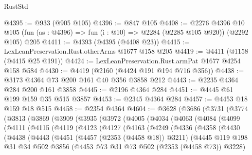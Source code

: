\begin{lexlean}{RustStd}
\begin{coremodule}
@4395 := @933 (@905 @105)
@4396 := @847 @105
@4408 := @2276
    @4396
    @10
    @105
    (fun (as : @4396) => fun (i : @10) => @2284 (@2285 @105 @920))
    (@2292 @105)
    @205
@4411 := @4393 (@4395 (@4408 @23))
@4415 := LexLeanPreservation.Rust.otherArms @1677 @158 @205
@4419 := @4411 (@1158 (@4415 @25 @191))
@4424 := LexLeanPreservation.Rust.armPat @1677 @4254 @158 @584
@4430 := @4419 (@2160 (@4424 @191 @194 @716 @356))
@4438 := @3173 @4364 @73 @200 @161 @40 @356 @3858 @212
@4443 := @2235 @4364 @284 @200 @161 @3858
@4445 := @2196 @4364 @284
@4451 := @4445 @61 @199 @159 @35 @515 @3857
@4453 := @2345 @4364 @284
@4457 := @4453 @18 @159 @18 @515
@4458 := @2354 @4364
@4604 := @3628
    (@3686
      (@3731
        (@3774
          (@3813
            (@3869
              (@3909
                (@3935
                  (@3972
                    (@4005
                      (@4034
                        (@4063
                          (@4084
                            (@4099
                              (@4111
                                (@4115
                                  (@4119
                                    (@4123
                                      (@4127
                                        (@4163
                                          (@4249
                                            (@4336
                                              (@4358
                                                (@4430
                                                  (@4438
                                                    (@4443
                                                      (@4451
                                                        (@4457 (@2353 (@4458 @18)) @3211)
                                                        (@4445
                                                          @119
                                                          @198
                                                          @31
                                                          @34
                                                          @502
                                                          @3856
                                                          (@4453
                                                            @73
                                                            @31
                                                            @73
                                                            @502
                                                            (@2353 (@4458 @73))
                                                            @3228)

\end{coremodule}
\end{lexlean}
